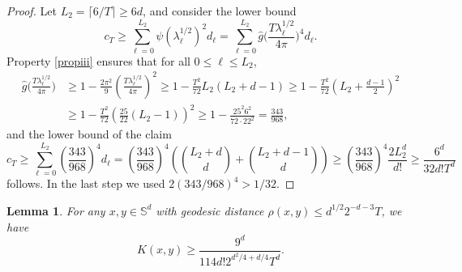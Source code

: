 \documentclass[11pt,a4paper]{article}
\newtheorem{lem}[thm]{Lemma}
\theoremstyle{definition}
\begin{document}
\begin{proof}
Let $L_2=\lceil 6/T \rceil \ge 6d$, and consider the lower bound
\[ c_T \ge \sum_{\ell=0}^{L_2} \psi (\lambda_{\ell}^{1/2})^2 d_{\ell} = \sum_{\ell=0}^{L_2} \widehat{g}\bigg( \frac{T\lambda_{\ell}^{1/2}}{4 \pi} \bigg)^4 d_{\ell} . \]
Property \eqref{propiii} ensures that for all $0 \le \ell \le L_2$,
\begin{equation}\label{ghatL2}
\begin{split} \widehat{g} \bigg( \frac{T\lambda_{\ell}^{1/2}}{4 \pi} \bigg) &\ge 1- \frac{2\pi^2}{9} \left( \frac{T \lambda_{\ell}^{1/2}}{4 \pi} \right)^2 \ge 1- \frac{T^2}{72} L_2 (L_2+d-1) \ge 1-\frac{T^2}{72} \left( L_2 + \frac{d-1}{2} \right)^2 \\ &\ge 1-\frac{T^2}{72} \left( \frac{25}{22} (L_2-1) \right)^2 \ge 1-\frac{25^2 6^2}{72 \cdot 22^2} = \frac{343}{968} , \end{split}
\end{equation}
and the lower bound of the claim
\[ c_T \ge \sum_{\ell=0}^{L_2} \left( \frac{343}{968} \right)^4 d_{\ell} = \left( \frac{343}{968} \right)^4 \left( \binom{L_2+d}{d} + \binom{L_2+d-1}{d} \right) \ge \left( \frac{343}{968} \right)^4 \frac{2 L_2^d}{d!} \ge \frac{6^d}{32 d! T^d} \]
follows. In the last step we used $2 (343/968)^4 >1/32$.
\end{proof}

\begin{lem}\label{Kxylemma} For any $x,y \in \mathbb{S}^d$ with geodesic distance $\rho (x,y) \le d^{1/2} 2^{-d-3} T$, we have
\[ K(x,y) \ge \frac{9^d}{114 d! 2^{d^2/4+d/4} T^d} . \]
\end{lem}
\end{document}
